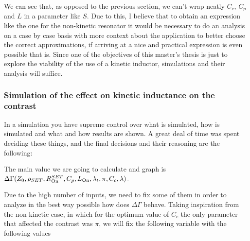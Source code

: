 \documentclass[../main.tex]{subfiles}
\begin{document}
We can see that, as opposed to the previous section,
we can't wrap neatly \(C_{c}\), \(C_{p}\) and \(L\) in a parameter like \(S\).
Due to this, I believe that to obtain an expression like the one for the
non-kinetic resonator it would be necessary to do an analysis on a case by
case basis with more context about the application to better choose the correct
approximations, if arriving at a nice and practical expression is even possible
that is. Since one of the objectives of this master's thesis is just to explore
the viability of the use of a kinetic inductor, simulations
and their analysis will suffice.

\subsubsection{Simulation of the effect on kinetic inductance on the contrast}
In a simulation you have supreme control over what is simulated, how is
simulated and what and how results are shown. A great deal of time was spent
deciding these things, and the final decisions and their reasoning are the following:

The main value we are going to calculate and graph is
\(\Delta\Gamma(Z_{0}, \rho_{SET}, R_{\text{On}}^{SET}, C_{p}, L_{\text{On}}, \lambda_{t}, \pi, C_{c}, \lambda)\).

Due to the high number of inputs, we need to fix some of them in order to analyze
in the best way possible how does \(\Delta\Gamma\) behave. Taking inspiration
from the non-kinetic case, in which for the optimum value of \(C_{c}\) the
only parameter that affected the contrast was \(\pi\), we will fix the following
variable with the following values

\end{document}
